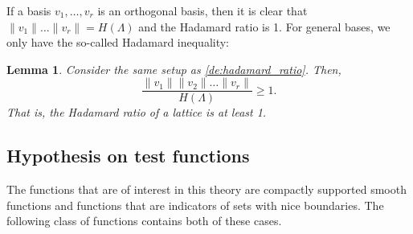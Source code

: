 \documentclass{amsart}
\newtheorem{lemma}[theorem]{Lemma}
\theoremstyle{definition}
\theoremstyle{remark}
\begin{document}
If a basis $v_{1},\dots,v_{r}$ is an orthogonal basis, then it is clear that $\|v_{1}\| \dots \|v_{r}\| = H(\Lambda)$ and the Hadamard ratio is 1. For general bases, we only have the so-called Hadamard inequality: 

\begin{lemma}
    \label{le:hadamard_bound}
    Consider the same setup as \cref{de:hadamard_ratio}. Then,
    \begin{equation}
        \frac{\|v_{1}\| \|v_{2}\| \dots \|v_{r}\|}{H(\Lambda)} \geq 1.
    \end{equation}
    That is, the Hadamard ratio of a lattice is at least 1. 
\end{lemma}



\subsection{Hypothesis on test functions}


\label{se:test_funcs}

The functions that are of interest in this theory are compactly supported smooth functions and functions that are indicators of sets with nice boundaries. The following class of functions contains both of these cases.
\end{document}
